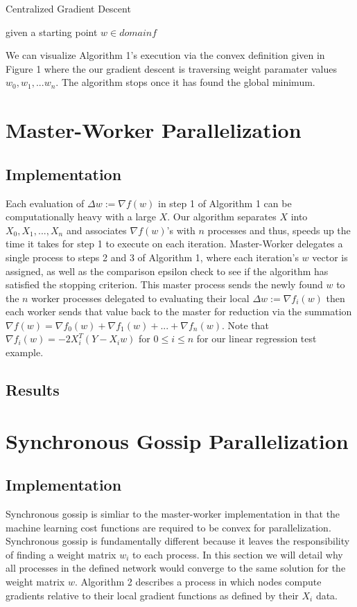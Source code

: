 \documentclass{article}
\theoremstyle{definition}
\begin{document}
\begin{algorithm}[!ht]
    \SetAlgoLined
    \caption{Centralized Gradient Descent}
    given a starting point $w \in domain f$\;
\end{algorithm}{

We can visualize Algorithm 1's execution via the convex definition given in Figure 1 where the our gradient descent is traversing weight paramater values $w_0, w_1, ... w_n$. The algorithm stops once it has found the global minimum.

\section{Master-Worker Parallelization}
\subsection{Implementation}
Each evaluation of $\Delta w := \nabla f(w)$ in step 1 of Algorithm 1 can be computationally heavy with a large $X$. Our algorithm separates $X$ into $X_0, X_1, ... ,X_n$ and associates $\nabla f(w)$'s with $n$ processes and thus, speeds up the time it takes for step 1 to execute on each iteration. Master-Worker delegates a single process to steps 2 and 3 of Algorithm 1, where each iteration's $w$ vector is assigned, as well as the comparison epsilon check to see if the algorithm has satisfied the stopping criterion. This master process sends the newly found $w$ to the $n$ worker processes delegated to evaluating their local $\Delta w := \nabla f_i(w)$ then each worker sends that value back to the master for reduction via the summation $\nabla f(w) = \nabla f_0(w) + \nabla f_1(w) + ... + \nabla f_n(w)$. Note that $\nabla f_i(w) = -2X_i^T(Y - X_iw)$ for $0 \leq i \leq n$ for our linear regression test example.

\subsection{Results}

\section{Synchronous Gossip Parallelization}
\subsection{Implementation}
Synchronous gossip is simliar to the master-worker implementation in that the machine learning cost functions are required to be convex for parallelization. Synchronous gossip is fundamentally different because it leaves the responsibility of finding a weight matrix $w_i$ to each process. In this section we will detail why all processes in the defined network would converge to the same solution for the weight matrix $w$. Algorithm 2 describes a process in which nodes compute gradients relative to their local gradient functions as defined by their $X_i$ data.

}
\end{document}
